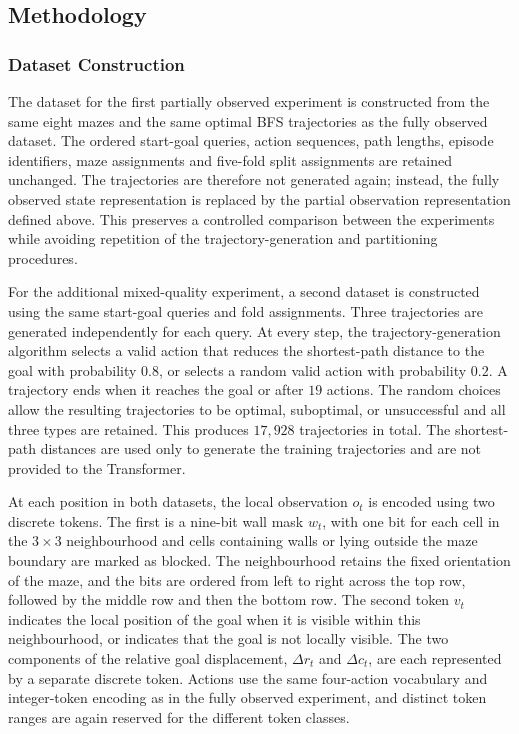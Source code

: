 ﻿\documentclass[12pt,a4paper]{article}
\theoremstyle{definition}
\begin{document}
\subsection{Methodology}

\subsubsection{Dataset Construction}
\label{sec:partial_dataset_construction}

The dataset for the first partially observed experiment is constructed from the same eight mazes and the same
optimal BFS trajectories as the fully observed dataset. The ordered start-goal queries,
action sequences, path lengths, episode identifiers, maze assignments and five-fold
split assignments are retained unchanged. The trajectories are therefore not generated
again; instead, the fully observed state representation is replaced by the partial
observation representation defined above. This preserves a controlled comparison between
the experiments while avoiding repetition of the trajectory-generation and partitioning
procedures.

For the additional mixed-quality experiment, a second dataset is constructed using the
same start-goal queries and fold assignments. Three trajectories are generated independently
for each query. At every step, the trajectory-generation algorithm selects a valid action
that reduces the shortest-path distance to the goal with probability $0.8$, or selects a
random valid action with probability $0.2$. A trajectory ends when it reaches the goal or
after $19$ actions. The random choices allow the resulting trajectories to be optimal,
suboptimal, or unsuccessful and all three types are retained. This produces $17{,}928$
trajectories in total. The shortest-path distances are used only to generate the training
trajectories and are not provided to the Transformer.

At each position in both datasets, the local observation $o_t$ is encoded using two discrete tokens. The
first is a nine-bit wall mask $w_t$, with one bit for each cell in the $3\times3$
neighbourhood and cells containing walls or lying outside the maze boundary are marked as
blocked. The neighbourhood retains the fixed orientation of the maze, and the bits are
ordered from left to right across the top row, followed by the middle row and then the
bottom row. The second token $v_t$ indicates the local position of the goal when it is visible
within this neighbourhood, or indicates that the goal is not locally visible. The two
components of the relative goal displacement, $\Delta r_t$ and $\Delta c_t$, are each
represented by a separate discrete token. Actions use the same four-action vocabulary
and integer-token encoding as in the fully observed experiment, and distinct token ranges
are again reserved for the different token classes.
\end{document}
